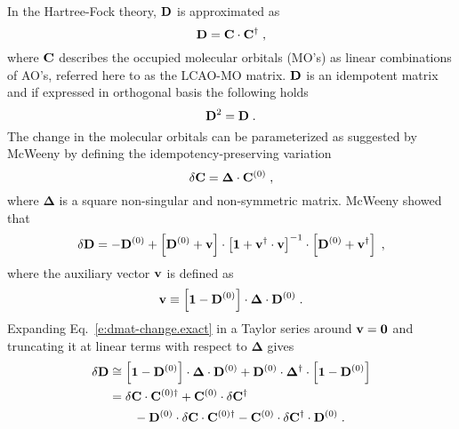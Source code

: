 \documentclass[aip,jcp,preprint,amsmath,amssymb,floatfix]{revtex4-1}
\newcommand{\BM}[1]{\bm{#1}}
\begin{document}
In the Hartree\hyp{}Fock theory,\cite{Roothaan.RevModPhys.1951} ${\bf D}$ is approximated as
%
\begin{equation}
 {\bf D} = {\bf C} \cdot {\bf C}^\dagger \;,
\end{equation}
%
where ${\bf C}$ describes the occupied molecular orbitals (MO's) as linear combinations
of AO's, referred here to as the LCAO-MO matrix.
${\bf D}$ is an idempotent matrix and if expressed in orthogonal basis the following holds
%
\begin{equation}
 {\bf D}^2 = {\bf D} \;.
\end{equation}
%
The change in the molecular orbitals can be parameterized as suggested by McWeeny\cite{McWeeny.RevModPhys.1960}
by defining the idempotency\hyp{}preserving variation
%
\begin{equation}
 \delta {\bf C} = {\BM\Delta} \cdot {\bf C}^{(0)} \;,
\end{equation}
%
where $\BM\Delta$ is a square non\hyp{}singular and non\hyp{}symmetric matrix.
McWeeny showed that
%
\begin{equation} \label{e:dmat-change.exact}
 \delta {\bf D} = -{\bf D}^{(0)} + \left[ {\bf D}^{(0)} + {\bf v} \right] \cdot
                                   \left[ {\bf 1} + {\bf v}^\dagger \cdot {\bf v} \right]^{-1} \cdot
                                   \left[ {\bf D}^{(0)} + {\bf v}^\dagger \right] \;,
\end{equation}
%
where the auxiliary vector ${\bf v}$ is defined as
%
\begin{equation}
 {\bf v} \equiv \left[ {\bf 1} - {\bf D}^{(0)} \right] \cdot {\BM\Delta} \cdot {\bf D}^{(0)}  \;.
\end{equation}
%
Expanding Eq.~\eqref{e:dmat-change.exact} in a Taylor series around ${\bf v}={\bf 0}$ and
truncating it at linear terms with respect to ${\BM\Delta}$ gives
%
\begin{subequations} 
 \begin{align}
 \delta {\bf D} &\cong \left[ {\bf 1} - {\bf D}^{(0)} \right] \cdot {\BM\Delta} \cdot {\bf D}^{(0)} + 
                        {\bf D}^{(0)} \cdot {\BM\Delta}^\dagger \cdot \left[ {\bf 1} - {\bf D}^{(0)} \right]  
 \label{e:dD-1} \\  &= 
  \delta {\bf C} \cdot {\bf C}^{(0)\dagger} + {\bf C}^{(0)} \cdot \delta {\bf C}^\dagger \nonumber \\
           &\qquad - {\bf D}^{(0)} \cdot \delta {\bf C} \cdot {\bf C}^{{(0)}\dagger} 
                   - {\bf C}^{(0)} \cdot \delta {\bf C}^\dagger \cdot {\bf D}^{(0)}  \;.
 \label{e:dD-2}
 \end{align}
\end{subequations}
\end{document}
